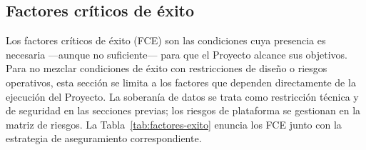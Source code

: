 \documentclass[a4paper, 12pt]{article}
\begin{document}
\subsection{Factores cr\'iticos de \'exito}

Los factores cr\'iticos de \'exito (FCE) son las condiciones cuya presencia es necesaria ---aunque no suficiente--- para que el Proyecto alcance sus objetivos. Para no mezclar condiciones de \'exito con restricciones de dise\~no o riesgos operativos, esta secci\'on se limita a los factores que dependen directamente de la ejecuci\'on del Proyecto. La soberan\'ia de datos se trata como restricci\'on t\'ecnica y de seguridad en las secciones previas; los riesgos de plataforma se gestionan en la matriz de riesgos. La Tabla~\ref{tab:factores-exito} enuncia los FCE junto con la estrategia de aseguramiento correspondiente.
\end{document}
